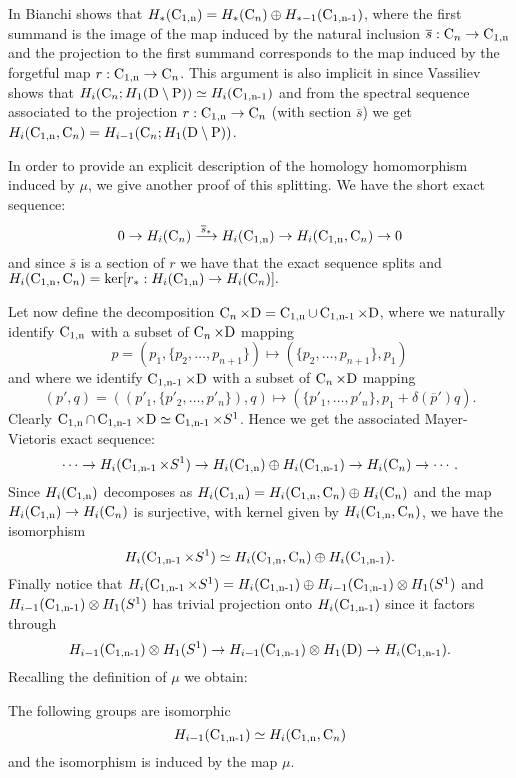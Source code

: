 

In \cite[Thm.~12]{bianchi} Bianchi shows that $H_*(\operatorname{C_{1,n}}) = H_*(\operatorname{C}_n) \oplus H_{*-1}(\operatorname{C_{1,n-1}})$, where the first summand is the image of the map induced by the natural inclusion $\overline{s}: \operatorname{C}_n \to \operatorname{C_{1,n}}$
and the projection to the first summand corresponds to the map induced by the forgetful map $r:\operatorname{C_{1,n}} \to \operatorname{C}_n$. This argument is also implicit in \cite[Ch. 1,~\S 5]{vas} since Vassiliev shows that $H_i(\operatorname{C}_n; H_1(\mathrm{D} \setminus \mathrm{P})) \simeq H_i(\operatorname{C_{1,n-1}})$ and from the spectral sequence associated to the projection $r:\operatorname{C_{1,n}} \to \operatorname{C}_n$ (with section $\bar s$) we get $H_i(\operatorname{C_{1,n}}, \operatorname{C}_n) =  H_{i-1}(\operatorname{C}_n; H_1(\mathrm{D} \setminus \mathrm{P}))
$. 

In order to provide an explicit description of the homology homomorphism induced by $\mu$, we give another proof of this splitting.
We have the short exact sequence:
$$
0 \to H_i(\operatorname{C}_n) \stackrel{\overline{s}_*}{\longrightarrow} H_i(\operatorname{C_{1,n}}) \to H_i(\operatorname{C_{1,n}}, \operatorname{C}_n) \to 0
$$
and since $\overline{s}$ is a section of $r$ we have that the exact sequence splits and 
$
H_i(\operatorname{C_{1,n}}, \operatorname{C}_n) = \ker [r_*: H_i(\operatorname{C_{1,n}}) \to H_i(\operatorname{C}_n)].
$

Let now define the decomposition 
$\operatorname{C}_n \times \mathrm{D} = \operatorname{C_{1,n}} \cup \operatorname{C_{1,n-1}} \times \mathrm{D}$, where we naturally identify $\operatorname{C_{1,n}}$ with a subset of $\operatorname{C}_n \times \mathrm{D}$ mapping
$$
p= (p_1, \{p_2, \ldots, p_{n+1}\}) \mapsto (\{p_2, \ldots, p_{n+1}\}, p_1)
$$
and where we identify $\operatorname{C_{1,n-1}}\times \mathrm{D}$ with a subset of $\operatorname{C}_n \times \mathrm{D}$ mapping
$$
(p',q)= ((p'_1, \{p'_2, \ldots, p'_{n}\}),q) \mapsto (\{p'_1, \ldots, p'_n\}, p_1+\delta(\overline{p}')q).
$$
Clearly $\operatorname{C_{1,n}} \cap \operatorname{C_{1,n-1}} \times \mathrm{D} \simeq \operatorname{C_{1,n-1}} \times S^1$.
Hence we get the associated Mayer-Vietoris exact sequence:
$$
\cdots \to H_i(\operatorname{C_{1,n-1}} \times S^1) \to H_i(\operatorname{C_{1,n}}) \oplus H_i(\operatorname{C_{1,n-1}}) \to H_i(\operatorname{C}_n) \to \cdots.
$$
Since $H_i(\operatorname{C_{1,n}})$ decomposes as $H_i(\operatorname{C_{1,n}}) = H_i(\operatorname{C_{1,n}},\operatorname{C}_n) \oplus H_i(\operatorname{C}_n)$ and the map $H_i(\operatorname{C_{1,n}}) \to H_i(\operatorname{C}_n)$ is surjective, with kernel given by $H_i(\operatorname{C_{1,n}}, \operatorname{C}_n)$, we have the isomorphism
$$
H_i(\operatorname{C_{1,n-1}} \times S^1) \simeq  H_i(\operatorname{C_{1,n}},\operatorname{C}_n) \oplus H_i(\operatorname{C_{1,n-1}}).
$$
Finally notice that $H_i(\operatorname{C_{1,n-1}} \times S^1) = H_i(\operatorname{C_{1,n-1}}) \oplus  H_{i-1}(\operatorname{C_{1,n-1}}) \otimes H_1(S^1)$ and $H_{i-1}(\operatorname{C_{1,n-1}}) \otimes H_1(S^1)$ has trivial projection onto $H_i(\operatorname{C_{1,n-1}})$ since it factors through 
$$
H_{i-1}(\operatorname{C_{1,n-1}}) \otimes H_1(S^1) \to H_{i-1}(\operatorname{C_{1,n-1}}) \otimes H_1(\mathrm{D}) \to H_i(\operatorname{C_{1,n-1}}).
$$
Recalling the definition of $\mu$ we obtain:
\begin{prop} \label{prop:isodellesemplicifazioni}The following groups are isomorphic
$$
H_{i-1}(\operatorname{C_{1,n-1}}) \simeq H_i(\operatorname{C_{1,n}},\operatorname{C}_n)
$$
and the isomorphism is induced by the map $\mu$.
\end{prop}

